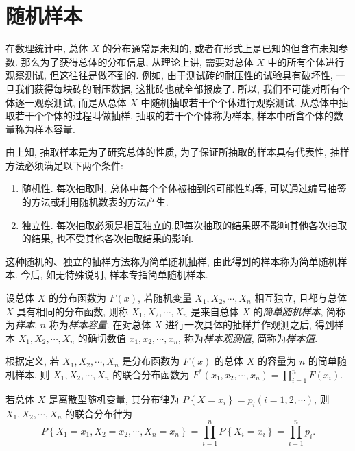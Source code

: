 \section{随机样本}

在数理统计中, 总体 $ X $ 的分布通常是未知的, 或者在形式上是已知的但含有未知参数. 
那么为了获得总体的分布信息, 从理论上讲, 需要对总体 $ X $ 中的所有个体进行观察测试, 但这往往是做不到的. 
例如, 由于测试砖的耐压性的试验具有破坏性, 一旦我们获得每块砖的耐压数据, 这批砖也就全部报废了. 
所以, 我们不可能对所有个体逐一观察测试, 而是从总体 $ X $ 中随机抽取若干个个休进行观察测试. 从总体中抽取若干个个体的过程叫做抽样, 抽取的若干个个体称为样本, 样本中所含个体的数量称为样本容量.

由上知, 抽取样本是为了研究总体的性质, 为了保证所抽取的样本具有代表性, 抽样方法必须满足以下两个条件:
\begin{enumerate}[label=(\arabic{*})]
    \item 随机性. 每次抽取时, 总体中每个个体被抽到的可能性均等, 可以通过编号抽签的方法或利用随机数表的方法产生.
    \item 独立性. 每次抽取必须是相互独立的,即每次抽取的结果既不影响其他各次抽取的结果, 也不受其他各次抽取结果的影响.
\end{enumerate}

这种随机的、独立的抽样方法称为简单随机抽样, 由此得到的样本称为简单随机样本. 今后, 如无特殊说明, 样本专指简单随机样本.

\begin{definition}[样本与样本值]
    设总体 $ X $ 的分布函数为 $ F(x) $, 若随机变量 $ X_{1}, X_{2}, \cdots, X_{n} $ 相互独立, 且都与总体 $ X $ 具有相同的分布函数, 则称 $ X_{1}, X_{2}, \cdots, X_{n} $ 是来自总体 $ X $ 的\textit{简单随机样本}, 简称为\textit{样本}, $ n $ 称为\textit{样本容量}. 
    在对总体 $ X $ 进行一次具体的抽样并作观测之后, 得到样本 $ X_{1} ,  X_{2}, \cdots, X_{n} $ 的确切数值 $ x_{1}, x_{2}, \cdots, x_{n} $, 称为\textit{样本观测值}, 简称为\textit{样本值}.
\end{definition}

根据定义, 若 $ X_{1}, X_{2}, \cdots, X_{n} $ 是分布函数为 $ F(x) $ 的总体 $ X $ 的容量为 $ n $ 的简单随机样本, 则 $ X_{1}, X_{2}, \cdots, X_{n} $ 的联合分布函数为 $\displaystyle F^{*}\left(x_{1}, x_{2}, \cdots, x_{n}\right)=\prod_{i=1}^{n} F\left(x_{i}\right) $.

若总体 $ X $ 是离散型随机变量, 其分布律为 $ P\left\{X=x_{i}\right\}=p_{i}(i=1,2, \cdots) $, 则 $ X_{1}, X_{2}, \cdots ,  X_{n} $ 的联合分布律为
$$P\left\{X_{1}=x_{1}, X_{2}=x_{2}, \cdots, X_{n}=x_{n}\right\}=\prod_{i=1}^{n} P\left\{X_{i}=x_{i}\right\}=\prod_{i=1}^{n} p_{i} .$$

